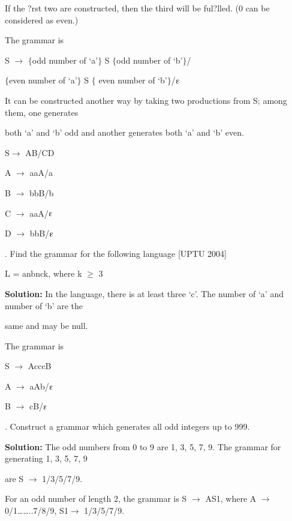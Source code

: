 \documentclass{article} %
\begin{document}
\noindent 

\noindent If the ?rst two are constructed, then the third will be ful?lled. (0 can be considered as even.)

\noindent  The grammar is

\noindent S $\mathrm{\to}$ $\mathrm{\{}$odd number of `a'$\mathrm{\}}$ S $\mathrm{\{}$odd number of `b'$\mathrm{\}}$/

\noindent $\mathrm{\{}$even number of `a'$\mathrm{\}}$ S $\mathrm{\{}$ even number of `b'$\mathrm{\}}$/$\varepsilonup$

\noindent  It can be constructed another way by taking two productions from S; among them, one generates

\noindent both `a' and `b' odd and another generates both `a' and `b' even.

\noindent S$\mathrm{\to}$ AB/CD

\noindent  A $\mathrm{\to}$ aaA/a 

\noindent B $\mathrm{\to}$ bbB/b 

\noindent C $\mathrm{\to}$ aaA/$\varepsilonup$

\noindent D $\mathrm{\to}$ bbB/$\varepsilonup$ 

. Find the grammar for the following language                                                              [UPTU 2004] 

\noindent L = anbnck, where k $\mathrm{\ge}$ 3

\noindent \textbf{Solution:} In the language, there is at least three `c'. The number of `a' and number of `b' are the 

\noindent same and may be null. 

\noindent The grammar is

\noindent S $\mathrm{\to}$ AcccB 

\noindent A $\mathrm{\to}$ aAb/$\varepsilonup$

\noindent B $\mathrm{\to}$ cB/$\varepsilonup$ 

. Construct a grammar which generates all odd integers up to 999.

\noindent \textbf{Solution:} The odd numbers from 0 to 9 are 1, 3, 5, 7, 9. The grammar for generating 1, 3, 5, 7, 9

\noindent  are S $\mathrm{\to}$ 1/3/5/7/9.

\noindent For an odd number of length 2, the grammar is S $\mathrm{\to}$ AS1, where A $\mathrm{\to}$ 0/1{\dots}{\dots}..7/8/9, S1$\mathrm{\to}$ 1/3/5/7/9.
\end{document}
